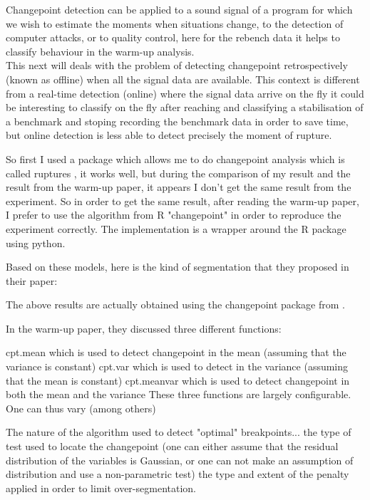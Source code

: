 \documentclass{article}
\begin{document}
Changepoint detection can be applied to a sound signal of a program for which we wish to estimate the moments when situations change, to the detection of computer attacks, or to quality control, here for the rebench data it helps to classify behaviour in the warm-up analysis. \\

This next will deals with the problem of detecting changepoint retrospectively (known as offline) when all the signal data are available. This context is different from a real-time detection (online) where the signal data arrive on the fly it could be interesting to classify on the fly after reaching and classifying a stabilisation of a benchmark and stoping recording the benchmark data in order to save time, but online detection is less able to detect precisely the moment of rupture.

So first I used a package which allows me to do changepoint analysis which is called ruptures \citep{truong2020selective}, it works well, but during the comparison of my result and the result from the warm-up paper, it appears I don't get the same result from the experiment. So in order to get the same result, after reading the warm-up paper, I prefer to use the algorithm from R "changepoint" \citep{killick2014changepoint} in order to reproduce the experiment correctly. The implementation is a wrapper around the R package using python. 

Based on these models, here is the kind of segmentation that they proposed in their paper:

The above results are actually obtained using the changepoint package from \citep{killick2014changepoint}.

In the warm-up paper, they discussed three different functions:

cpt.mean which is used to detect changepoint in the mean (assuming that the variance is constant)
cpt.var which is used to detect  in the variance (assuming that the mean is constant)
cpt.meanvar which is used to detect changepoint in both the mean and the variance
These three functions are largely configurable. One can thus vary (among others)

The nature of the algorithm used to detect "optimal" breakpoints...
the type of test used to locate the changepoint (one can either assume that the residual distribution of the variables is Gaussian, or one can not make an assumption of distribution and use a non-parametric test)
the type and extent of the penalty applied in order to limit over-segmentation.
\end{document}
